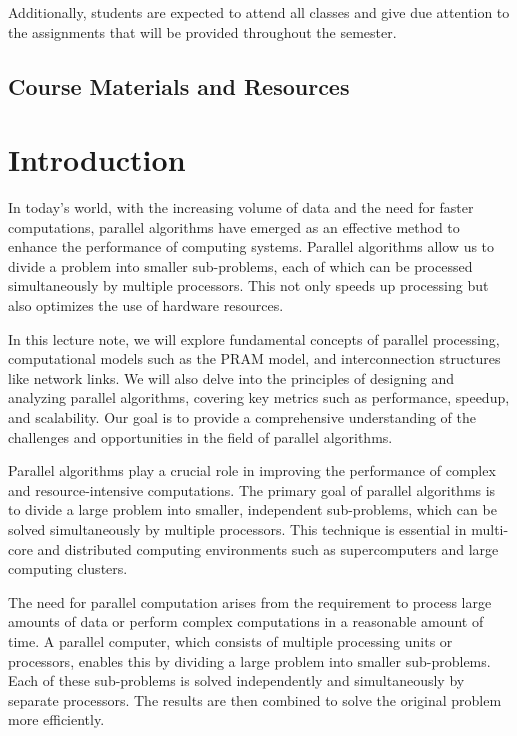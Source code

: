 \documentclass[a4paper, 10pt]{book}
\begin{document}
        Additionally, students are expected to attend all classes and give due attention to the assignments that will be provided throughout the semester.
        
    \section{Course Materials and Resources}

    \tableofcontents
    
    \chapter{{\bold Introduction}}


        In today’s world, with the increasing volume of data and the need for faster computations, parallel algorithms have emerged as an effective method to enhance the performance of computing systems. Parallel algorithms allow us to divide a problem into smaller sub-problems, each of which can be processed simultaneously by multiple processors. This not only speeds up processing but also optimizes the use of hardware resources.

        In this lecture note, we will explore fundamental concepts of parallel processing, computational models such as the PRAM model, and interconnection structures like network links. We will also delve into the principles of designing and analyzing parallel algorithms, covering key metrics such as performance, speedup, and scalability. Our goal is to provide a comprehensive understanding of the challenges and opportunities in the field of parallel algorithms.

        Parallel algorithms play a crucial role in improving the performance of complex and resource-intensive computations. The primary goal of parallel algorithms is to divide a large problem into smaller, independent sub-problems, which can be solved simultaneously by multiple processors. This technique is essential in multi-core and distributed computing environments such as supercomputers and large computing clusters.

        The need for parallel computation arises from the requirement to process large amounts of data or perform complex computations in a reasonable amount of time. A parallel computer, which consists of multiple processing units or processors, enables this by dividing a large problem into smaller sub-problems. Each of these sub-problems is solved independently and simultaneously by separate processors. The results are then combined to solve the original problem more efficiently.
\end{document}
